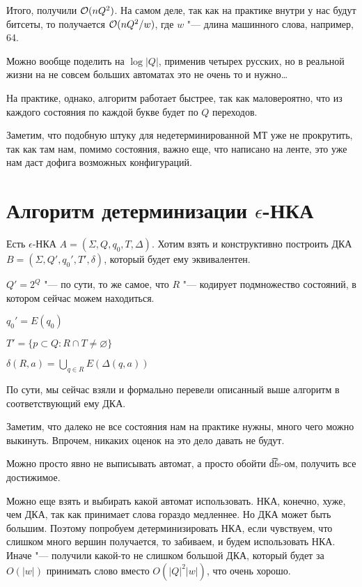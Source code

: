 Итого, получили $\mathcal{O}(nQ^2)$. На самом деле, так как на практике внутри у нас будут битсеты, то получается $\mathcal{O}(nQ^2/w)$, где $w$ "--- длина машинного слова, например, 64.

Можно вообще поделить на $\log |Q|$, применив четырех русских, но в реальной жизни на не совсем больших автоматах это не очень то и нужно\dots

\begin{Rem}
На практике, однако, алгоритм работает быстрее, так как маловероятно, что из каждого состояния по каждой букве будет по $Q$ переходов.
\end{Rem}

\begin{Rem}
Заметим, что подобную штуку для недетерминированной МТ уже не прокрутить, так как там нам, помимо состояния, важно еще, что написано на ленте, это уже нам даст дофига возможных конфигураций.
\end{Rem}


\section{Алгоритм детерминизации \texorpdfstring{$\epsilon$}{epsilon}-НКА}
Есть $\epsilon$-НКА $A = (\Sigma, Q, q_0, T, \Delta)$. 
Хотим взять и конструктивно построить ДКА $B = (\Sigma, Q', q_0', T', \delta)$, который будет ему эквивалентен.

$Q' = 2^Q$ "--- по сути, то же самое, что $R$ "--- кодирует подмножество состояний, в котором сейчас можем находиться.

$q_0' = E(q_0)$

$T' = \{p \subset Q: R\cap T \neq \varnothing\}$

$\delta(R, a) = \bigcup\limits_{q \in R} E(\Delta(q, a))$

По сути, мы сейчас взяли и формально перевели описанный выше алгоритм в соответствующий ему ДКА.

\begin{Rem}
Заметим, что далеко не все состояния нам на практике нужны, много чего можно выкинуть. Впрочем, никаких оценок на это дело давать не будут.

Можно просто явно не выписывать автомат, а просто обойти \t{dfs}-ом, получить все достижимое.

Можно еще взять и выбирать какой автомат использовать. 
НКА, конечно, хуже, чем ДКА, так как принимает слова гораздо медленнее. Но ДКА может быть большим. 
Поэтому попробуем детерминизировать НКА, если чувствуем, что слишком много вершин получается, то забиваем, и будем использовать НКА. 
Иначе "--- получили какой-то не слишком большой ДКА, который будет за $O(|w|)$ принимать слово вместо $O(|Q|^2|w|)$, что очень хорошо.
\end{Rem}


